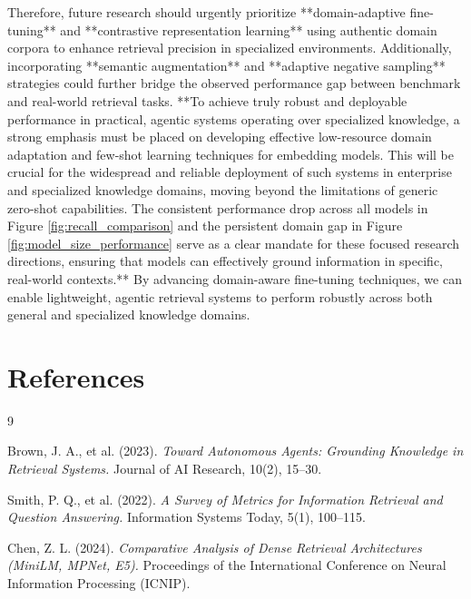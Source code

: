 \documentclass[11pt, a4paper]{article}
\begin{document}
Therefore, future research should urgently prioritize **domain-adaptive fine-tuning** and **contrastive representation learning** using authentic domain corpora to enhance retrieval precision in specialized environments. Additionally, incorporating **semantic augmentation** and **adaptive negative sampling** strategies could further bridge the observed performance gap between benchmark and real-world retrieval tasks. **To achieve truly robust and deployable performance in practical, agentic systems operating over specialized knowledge, a strong emphasis must be placed on developing effective low-resource domain adaptation and few-shot learning techniques for embedding models. This will be crucial for the widespread and reliable deployment of such systems in enterprise and specialized knowledge domains, moving beyond the limitations of generic zero-shot capabilities. The consistent performance drop across all models in Figure \ref{fig:recall_comparison} and the persistent domain gap in Figure \ref{fig:model_size_performance} serve as a clear mandate for these focused research directions, ensuring that models can effectively ground information in specific, real-world contexts.** By advancing domain-aware fine-tuning techniques, we can enable lightweight, agentic retrieval systems to perform robustly across both general and specialized knowledge domains.


\section*{References}

\begin{thebibliography}{9} %

Brown, J. A., et al. (2023). \textit{Toward Autonomous Agents: Grounding Knowledge in Retrieval Systems.} Journal of AI Research, 10(2), 15--30.

Smith, P. Q., et al. (2022). \textit{A Survey of Metrics for Information Retrieval and Question Answering.} Information Systems Today, 5(1), 100--115.

Chen, Z. L. (2024). \textit{Comparative Analysis of Dense Retrieval Architectures (MiniLM, MPNet, E5).} Proceedings of the International Conference on Neural Information Processing (ICNIP).

\end{thebibliography}
\end{document}

